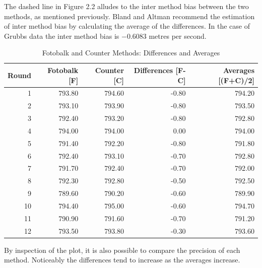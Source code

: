 \documentclass[12pt, a4paper]{report}
\theoremstyle{plain}
\theoremstyle{definition}
\theoremstyle{remark}
\begin{document}
	
	
	
	The dashed line in Figure 2.2 alludes to the inter method bias
	between the two methods, as mentioned previously. Bland and Altman
	recommend the estimation of inter method bias by calculating the
	average of the differences. In the case of Grubbs data the inter
	method bias is $-0.6083$ metres per second.
	\newpage
	
	\begin{table}[tbh]
		\begin{center}
			
			\begin{tabular}{rrrrr}
				\hline
				Round & Fotobalk [F] & Counter [C] & Differences [F-C] & Averages [(F+C)/2] \\
				\hline
				1 & 793.80 & 794.60 & -0.80 & 794.20 \\
				2 & 793.10 & 793.90 & -0.80 & 793.50 \\
				3 & 792.40 & 793.20 & -0.80 & 792.80 \\
				4 & 794.00 & 794.00 & 0.00 & 794.00 \\
				5 & 791.40 & 792.20 & -0.80 & 791.80 \\
				6 & 792.40 & 793.10 & -0.70 & 792.80 \\
				7 & 791.70 & 792.40 & -0.70 & 792.00 \\
				8 & 792.30 & 792.80 & -0.50 & 792.50 \\
				9 & 789.60 & 790.20 & -0.60 & 789.90 \\
				10 & 794.40 & 795.00 & -0.60 & 794.70 \\
				11 & 790.90 & 791.60 & -0.70 & 791.20 \\
				12 & 793.50 & 793.80 & -0.30 & 793.60 \\
				\hline
			\end{tabular}
			\caption{Fotobalk and Counter Methods: Differences and Averages}
		\end{center}
	\end{table}
	
	
	
	By inspection of the plot, it is also possible to compare the
	precision of each method. Noticeably the differences tend to
	increase as the averages increase.
	
\end{document}

